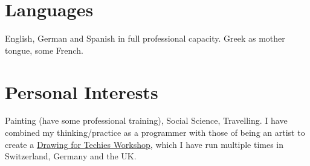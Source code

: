 \documentclass[10pt]{article} %
\begin{document}
\begin{minipage}[t]{0.5\textwidth}








	

\end{minipage} %
\hfill
\begin{minipage}[t]{0.44\textwidth} %
\vspace{0pt} %


\section{Languages} 
\normalsize{English, German and Spanish in full professional capacity. Greek as mother tongue, some French.}\\

\section{Personal Interests} 
    \normalsize{Painting (have some professional training), Social Science, Travelling. I have combined my thinking/practice as a programmer with those of being an artist to create a \href{https://medium.com/@_sandtweets/learn-drawing-and-programming-at-the-same-time-at-mozfest-2017-6a9f8627b72}{Drawing for Techies Workshop}, which I have run multiple times in Switzerland, Germany and the UK.}\\
	
\end{minipage} %
\end{document}
